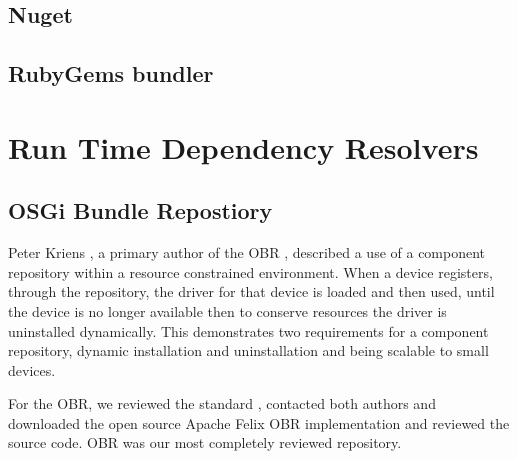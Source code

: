\subsection{Nuget} 

\subsection{RubyGems bundler}

\section{Run Time Dependency Resolvers}

\subsection{OSGi Bundle Repostiory}
Peter Kriens \cite{kriens_osgi_2008}, 
a primary author of the OBR \cite{the_osgi_alliance_rfc-0112_2006}, described a use of a component repository within a resource constrained environment.
When a device registers, 
through the repository, the driver for that device is loaded and then used, until the device is no longer available
then to conserve resources the driver is uninstalled dynamically. 
This demonstrates two requirements for a component repository, dynamic installation and uninstallation and being scalable to small devices.

For the OBR, we reviewed the standard \cite{the_osgi_alliance_rfc-0112_2006}, 
contacted both authors \cite{kriens_osgi_2008, richard_s._hall_obr_2008} 
and downloaded the open source Apache Felix OBR implementation and reviewed the source code.
OBR was our most completely reviewed repository.

